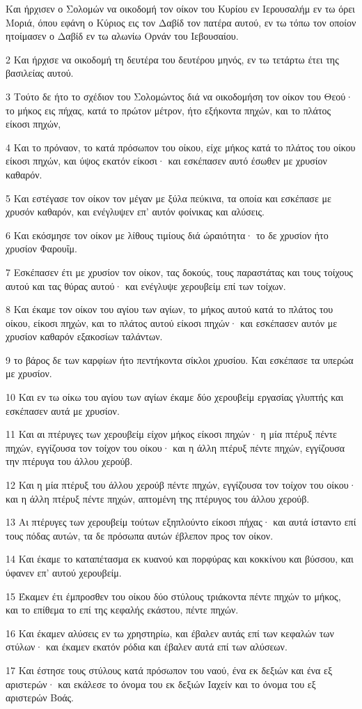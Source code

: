 \par Και ήρχισεν ο Σολομών να οικοδομή τον οίκον του Κυρίου εν Ιερουσαλήμ εν τω όρει Μοριά, όπου εφάνη ο Κύριος εις τον Δαβίδ τον πατέρα αυτού, εν τω τόπω τον οποίον ητοίμασεν ο Δαβίδ εν τω αλωνίω Ορνάν του Ιεβουσαίου.
\par 2 Και ήρχισε να οικοδομή τη δευτέρα του δευτέρου μηνός, εν τω τετάρτω έτει της βασιλείας αυτού.
\par 3 Τούτο δε ήτο το σχέδιον του Σολομώντος διά να οικοδομήση τον οίκον του Θεού· το μήκος εις πήχας, κατά το πρώτον μέτρον, ήτο εξήκοντα πηχών, και το πλάτος είκοσι πηχών,
\par 4 Και το πρόναον, το κατά πρόσωπον του οίκου, είχε μήκος κατά το πλάτος του οίκου είκοσι πηχών, και ύψος εκατόν είκοσι· και εσκέπασεν αυτό έσωθεν με χρυσίον καθαρόν.
\par 5 Και εστέγασε τον οίκον τον μέγαν με ξύλα πεύκινα, τα οποία και εσκέπασε με χρυσόν καθαρόν, και ενέγλυψεν επ' αυτόν φοίνικας και αλύσεις.
\par 6 Και εκόσμησε τον οίκον με λίθους τιμίους διά ώραιότητα· το δε χρυσίον ήτο χρυσίον Φαρουΐμ.
\par 7 Εσκέπασεν έτι με χρυσίον τον οίκον, τας δοκούς, τους παραστάτας και τους τοίχους αυτού και τας θύρας αυτού· και ενέγλυψε χερουβείμ επί των τοίχων.
\par 8 Και έκαμε τον οίκον του αγίου των αγίων, το μήκος αυτού κατά το πλάτος του οίκου, είκοσι πηχών, και το πλάτος αυτού είκοσι πηχών· και εσκέπασεν αυτόν με χρυσίον καθαρόν εξακοσίων ταλάντων.
\par 9 το βάρος δε των καρφίων ήτο πεντήκοντα σίκλοι χρυσίου. Και εσκέπασε τα υπερώα με χρυσίον.
\par 10 Και εν τω οίκω του αγίου των αγίων έκαμε δύο χερουβείμ εργασίας γλυπτής και εσκέπασεν αυτά με χρυσίον.
\par 11 Και αι πτέρυγες των χερουβείμ είχον μήκος είκοσι πηχών· η μία πτέρυξ πέντε πηχών, εγγίζουσα τον τοίχον του οίκου· και η άλλη πτέρυξ πέντε πηχών, εγγίζουσα την πτέρυγα του άλλου χερούβ.
\par 12 Και η μία πτέρυξ του άλλου χερούβ πέντε πηχών, εγγίζουσα τον τοίχον του οίκου· και η άλλη πτέρυξ πέντε πηχών, απτομένη της πτέρυγος του άλλου χερούβ.
\par 13 Αι πτέρυγες των χερουβείμ τούτων εξηπλούντο είκοσι πήχας· και αυτά ίσταντο επί τους πόδας αυτών, τα δε πρόσωπα αυτών έβλεπον προς τον οίκον.
\par 14 Και έκαμε το καταπέτασμα εκ κυανού και πορφύρας και κοκκίνου και βύσσου, και ύφανεν επ' αυτού χερουβείμ.
\par 15 Έκαμεν έτι έμπροσθεν του οίκου δύο στύλους τριάκοντα πέντε πηχών το μήκος, και το επίθεμα το επί της κεφαλής εκάστου, πέντε πηχών.
\par 16 Και έκαμεν αλύσεις εν τω χρηστηρίω, και έβαλεν αυτάς επί των κεφαλών των στύλων· και έκαμεν εκατόν ρόδια και έβαλεν αυτά επί των αλύσεων.
\par 17 Και έστησε τους στύλους κατά πρόσωπον του ναού, ένα εκ δεξιών και ένα εξ αριστερών· και εκάλεσε το όνομα του εκ δεξιών Ιαχείν και το όνομα του εξ αριστερών Βοάς.

